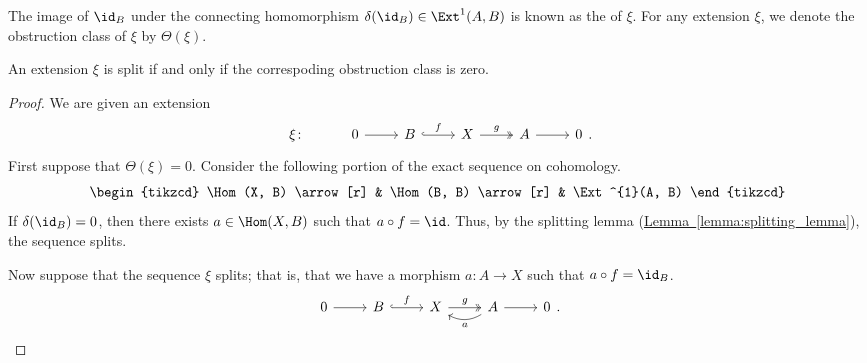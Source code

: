 \documentclass[main.tex]{subfiles}
\begin{document}
\begin{definition}
  \label{def:obstruction_class}
  The image of $\id_{B}$ under the connecting homomorphism $\delta(\id_{B}) \in \Ext^{1}(A, B)$ is known as the  of $\xi$. For any extension $\xi$, we denote the obstruction class of $\xi$ by $\Theta(\xi)$.
\end{definition}

\begin{proposition}
  \label{prop:obstruction_class_prevents_splitness}
  An extension $\xi$ is split if and only if the correspoding obstruction class is zero.
\end{proposition}
\begin{proof}
  We are given an extension
  \begin{equation*}
    \begin{tikzcd}
      \xi\colon
      & 0
      \arrow[r]
      & B
      \arrow[r, hook, "f"]
      & X
      \arrow[r, two heads, "g"]
      & A
      \arrow[r]
      & 0
    \end{tikzcd}.
  \end{equation*}
  First suppose that $\Theta(\xi) = 0$. Consider the following portion of the exact sequence on cohomology.
  \begin{equation*}
    \begin{tikzcd}
      \Hom(X, B)
      \arrow[r]
      & \Hom(B, B)
      \arrow[r]
      & \Ext^{1}(A, B)
    \end{tikzcd}
  \end{equation*}
  If $\delta(\id_{B}) = 0$, then there exists $a \in \Hom(X, B)$ such that $a \circ f = \id$. Thus, by the splitting lemma (\hyperref[lemma:splitting_lemma]{Lemma~\ref*{lemma:splitting_lemma}}), the sequence splits.

  Now suppose that the sequence $\xi$ splits; that is, that we have a morphism $a\colon A \to X$ such that $a \circ f = \id_{B}$.
  \begin{equation*}
    \begin{tikzcd}
      0
      \arrow[r]
      & B
      \arrow[r, hook, "f"]
      & X
      \arrow[r, two heads, "g"]
      & A
      \arrow[r]
      \arrow[l, bend left, "a"]
      & 0
    \end{tikzcd}.
  \end{equation*}


\end{proof}
\end{document}
